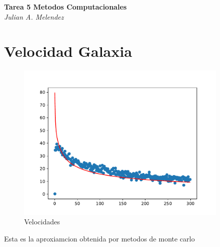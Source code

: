 \documentclass[letter]{article}
\begin{document}

\begin{center}
	\Large\textbf{Tarea 5 Metodos Computacionales}\\
	\large\textit{Julian A. Melendez}
\end{center}
\section{Velocidad Galaxia}
\begin{figure}[h]
  \centering
    \includegraphics[width=0.9\textwidth]{Velocidad.pdf}
	\caption{Velocidades}
\end{figure}
Esta es la aproxiamcion obtenida por metodos de monte carlo
\end{document}
